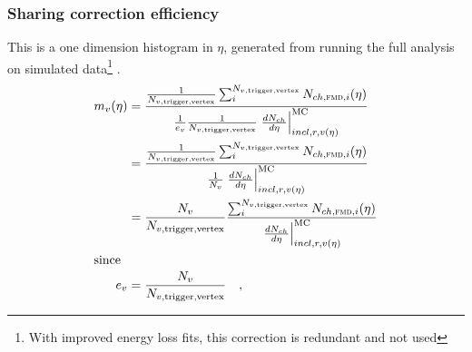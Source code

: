 \documentclass[11pt]{article}
\def\AlwaysText#1{\ifmmode\relax\text{#1}\else #1\fi}
\newcommand{\AbbrName}[1]{\AlwaysText{{\scshape #1}}}
\newcommand{\FMD}[1][]{\AbbrName{fmd\ifx|#1|\else#1\fi}}
\newcommand{\dndetadphi}[1][]{{\ensuremath%
    \ifx|#1|\else\left.\fi%
    \frac{d^2N_{ch}}{d\eta\,d\varphi}%
    \ifx|#1|\else\right|_{#1}\fi%
}}
\newcommand{\MC}{\AlwaysText{MC}}
\newcommand{\Nsel}{{\ensuremath N_{v,\text{trigger,vertex}}}}
\begin{document}
\subsubsection{Sharing correction efficiency}
This is a one dimension histogram in $\eta$, generated from running
the full analysis on simulated data\footnote{With improved energy loss
  fits, this correction is redundant and not used} .
  \begin{align}
    \label{eq:sharing_corr}
    m_v(\eta) &=
    \frac{\frac1{\Nsel}\sum_i^{\Nsel{}}N_{ch,\text{\FMD{}},i}(\eta)}{
      \frac{1}{e_{v}}\frac1{\Nsel{}}\left.\frac{dN_{ch}}{d\eta}
      \right|_{incl,r,v(\eta)}^{\MC{}}}
    \nonumber\\
    &=
    \frac{\frac1{\Nsel}\sum_i^{\Nsel{}}N_{ch,\text{\FMD{}},i}(\eta)}{
      \frac1{N_v}\left.\frac{dN_{ch}}{d\eta}\right|_{incl,r,v(\eta)}^{\MC}}
    \nonumber\\
    &= 
    \frac{N_v}{\Nsel{}}
    \frac{\sum_i^{\Nsel{}}N_{ch,\text{\FMD{}},i}(\eta)}{
      \left.\frac{dN_{ch}}{d\eta}\right|_{incl,r,v(\eta)}^{\MC}}\\
    \intertext{since}
    e_{v} &= \frac{N_{v}}{\Nsel{}}\quad,
  \end{align}
\end{document}
